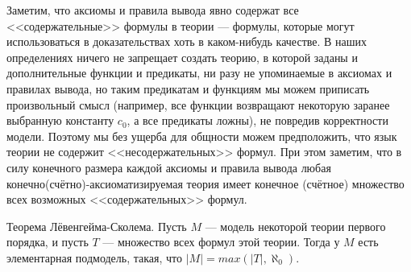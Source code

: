 Заметим, что аксиомы и правила вывода явно содержат все <<содержательные>> 
формулы в теории --- формулы, которые могут использоваться в доказательствах
хоть в каком-нибудь качестве. 
В наших определениях ничего не запрещает создать теорию, в которой 
заданы и дополнительные функции и предикаты, ни разу не упоминаемые в 
аксиомах и правилах вывода, но таким предикатам и 
функциям мы можем приписать произвольный смысл (например, все функции 
возвращают некоторую заранее выбранную константу $c_0$, а все предикаты 
ложны), не повредив корректности модели. Поэтому мы без ущерба для
общности можем предположить, что язык теории не содержит 
<<несодержательных>> формул.
При этом заметим, что в силу конечного размера каждой аксиомы и правила
вывода любая конечно(счётно)-аксиоматизируемая теория имеет
конечное (счётное) множество всех возможных <<содержательных>> формул.

\begin{theorem}{Теорема Лёвенгейма-Сколема.}
Пусть $M$ --- модель некоторой теории первого порядка, и пусть $T$ ---
множество всех формул этой теории. Тогда у $M$ есть элементарная
подмодель, такая, что $|M| = max(|T|, \aleph_0)$.
\end{theorem}

